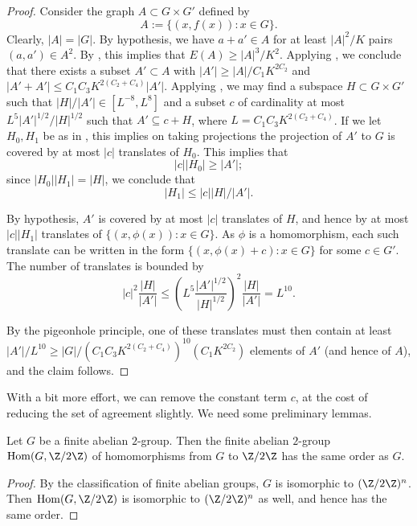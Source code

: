 \begin{proof}\leanok Consider the graph $A \subset G \times G'$ defined by
$$ A := \{ (x,f(x)): x \in G \}.$$
Clearly, $|A| = |G|$.  By hypothesis, we have $a+a' \in A$ for at least
$|A|^2/K$ pairs $(a,a') \in A^2$. By , this implies that $E(A)
\geq |A|^3/K^2$.  Applying , we conclude that there exists a subset
$A' \subset A$ with $|A'| \geq |A|/C_1 K^{2C_2}$ and $|A'+A'| \leq C_1C_3
K^{2(C_2+C_4)} |A'|$. Applying , we may find a subspace $H
\subset G \times G'$ such that $|H| / |A'| \in [L^{-8}, L^{8}]$ and a subset
$c$ of cardinality at most $L^5 |A'|^{1/2} / |H|^{1/2}$ such that $A'
\subseteq c + H$, where $L =  C_1C_3 K^{2(C_2+C_4)}$. If we let $H_0,H_1$ be
as in , this implies on taking projections the projection of
$A'$ to $G$ is covered by at most $|c|$ translates of $H_0$.  This implies
that
$$ |c| |H_0| \geq |A'|;$$
since $|H_0| |H_1| = |H|$, we conclude that
$$ |H_1| \leq |c| |H|/|A'|.$$

By hypothesis, $A'$ is covered by at most $|c|$ translates of $H$, and hence
by at most $|c| |H_1|$ translates of $\{ (x,\phi(x)): x \in G \}$.  As $\phi$
is a homomorphism, each such translate can be written in the form $\{
(x,\phi(x)+c): x \in G \}$ for some $c \in G'$. The number of translates is
bounded by
$$
|c|^2 \frac{|H|}{|A'|} \leq \left(L^5 \frac{|A'|^{1/2}}{|H|^{1/2}}\right)^2 \frac{|H|}{|A'|} = L^{10}.
$$

By the pigeonhole principle, one of these translates must then contain at
least $|A'|/L^{10} \geq |G| / (C_1C_3 K^{2(C_2+C_4)})^{10} (C_1 K^{2C_2})$
elements of $A'$ (and hence of $A$), and the claim follows.
\end{proof}

With a bit more effort, we can remove the constant term $c$, at the cost of reducing the set of agreement slightly.  We need some preliminary lemmas.

\begin{lemma}[Duality]\label{gdual}\leanok Let $G$ be a finite abelian $2$-group.  Then the finite abelian $2$-group $\mathrm{Hom}(G,\Z/2\Z)$ of homomorphisms from $G$ to $\Z/2\Z$ has the same order as $G$.
\end{lemma}

\begin{proof}\leanok By the classification of finite abelian groups, $G$ is isomorphic to $(\Z/2\Z)^n$.  Then $\mathrm{Hom}(G,\Z/2\Z)$ is isomorphic to $(\Z/2\Z)^n$ as well, and hence has the same order.
\end{proof}

